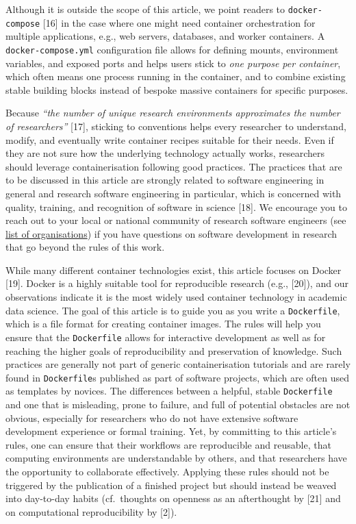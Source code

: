 \documentclass[10pt,letterpaper]{article}
\begin{document}
Although it is outside the scope of this article, we point readers to
\texttt{docker-compose} {[}16{]} in the case where one might need
container orchestration for multiple applications, e.g., web servers,
databases, and worker containers. A \texttt{docker-compose.yml}
configuration file allows for defining mounts, environment variables,
and exposed ports and helps users stick to \emph{one purpose per
container}, which often means one process running in the container, and
to combine existing stable building blocks instead of bespoke massive
containers for specific purposes.

Because \emph{``the number of unique research environments approximates
the number of researchers''} {[}17{]}, sticking to conventions helps
every researcher to understand, modify, and eventually write container
recipes suitable for their needs. Even if they are not sure how the
underlying technology actually works, researchers should leverage
containerisation following good practices. The practices that are to be
discussed in this article are strongly related to software engineering
in general and research software engineering in particular, which is
concerned with quality, training, and recognition of software in science
{[}18{]}. We encourage you to reach out to your local or national
community of research software engineers (see
\href{https://en.wikipedia.org/wiki/Research_software_engineering}{list
of organisations}) if you have questions on software development in
research that go beyond the rules of this work.

While many different container technologies exist, this article focuses
on Docker {[}19{]}. Docker is a highly suitable tool for reproducible
research (e.g., {[}20{]}), and our observations indicate it is the most
widely used container technology in academic data science. The goal of
this article is to guide you as you write a \texttt{Dockerfile}, which
is a file format for creating container images. The rules will help you
ensure that the \texttt{Dockerfile} allows for interactive development
as well as for reaching the higher goals of reproducibility and
preservation of knowledge. Such practices are generally not part of
generic containerisation tutorials and are rarely found in
\texttt{Dockerfile}s published as part of software projects, which are
often used as templates by novices. The differences between a helpful,
stable \texttt{Dockerfile} and one that is misleading, prone to failure,
and full of potential obstacles are not obvious, especially for
researchers who do not have extensive software development experience or
formal training. Yet, by committing to this article's rules, one can
ensure that their workflows are reproducible and reusable, that
computing environments are understandable by others, and that
researchers have the opportunity to collaborate effectively. Applying
these rules should not be triggered by the publication of a finished
project but should instead be weaved into day-to-day habits
(cf.~thoughts on openness as an afterthought by {[}21{]} and on
computational reproducibility by {[}2{]}).
\end{document}
